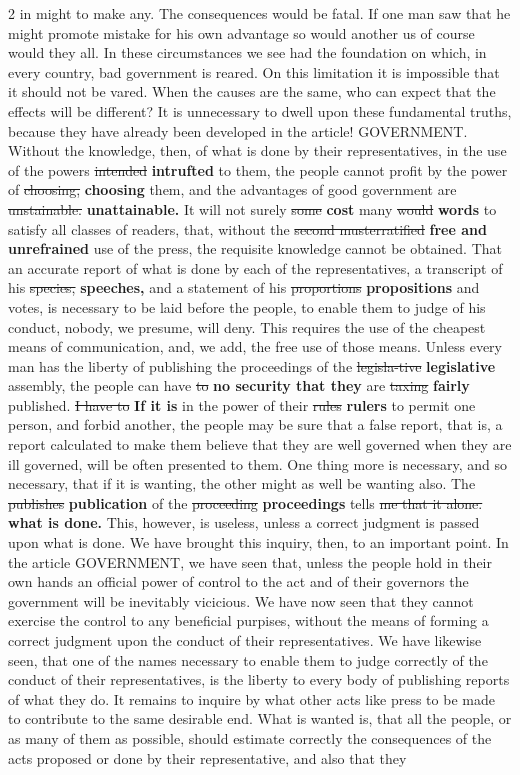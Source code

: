 \documentclass[10pt]{article}
\begin{document}
\begin{multicols}{2}
in might to make any. The consequences would be fatal. If one man saw that he might promote mistake for his own advantage so would another us of course would they all. In these circumstances we see had the foundation on which, in every country, bad government is reared. On this limitation it is impossible that it should not be vared. When the causes are the same, who can expect that the effects will be different? It is unnecessary to dwell upon these fundamental truths, because they have already been developed in the article! GOVERNMENT. Without the knowledge, then, of what is done by their representatives, in the use of the powers \sout{intended} \textbf{intrufted} to them, the people cannot profit by the power of \sout{choosing,} \textbf{choosing} them, and the advantages of good government are \sout{unstainable.} \textbf{unattainable.} It will not surely \sout{some} \textbf{cost} many \sout{would} \textbf{words} to satisfy all classes of readers, that, without the \sout{second musterratified} \textbf{free and unrefrained} use of the press, the requisite knowledge cannot be obtained. That an accurate report of what is done by each of the representatives, a transcript of his \sout{species,} \textbf{speeches,} and a statement of his \sout{proportions} \textbf{propositions} and votes, is necessary to be laid before the people, to enable them to judge of his conduct, nobody, we presume, will deny. This requires the use of the cheapest means of communication, and, we add, the free use of those means. Unless every man has the liberty of publishing the proceedings of the \sout{legisla-tive} \textbf{legislative} assembly, the people can have \sout{to} \textbf{no security that they} are \sout{taxing} \textbf{fairly} published. \sout{I have to} \textbf{If it is} in the power of their \sout{rules} \textbf{rulers} to permit one person, and forbid another, the people may be sure that a false report, that is, a report calculated to make them believe that they are well governed when they are ill governed, will be often presented to them. One thing more is necessary, and so necessary, that if it is wanting, the other might as well be wanting also. The \sout{publishes} \textbf{publication} of the \sout{proceeding} \textbf{proceedings} tells \sout{me that it alone.} \textbf{what is done.} This, however, is useless, unless a correct judgment is passed upon what is done. We have brought this inquiry, then, to an important point. In the article GOVERNMENT, we have seen that, unless the people hold in their own hands an official power of control to the act and of their governors the government will be inevitably vicicious. We have now seen that they cannot exercise the control to any beneficial purpises, without the means of forming a correct judgment upon the conduct of their representatives. We have likewise seen, that one of the names necessary to enable them to judge correctly of the conduct of their representatives, is the liberty to every body of publishing reports of what they do. It remains to inquire by what other acts like press to be made to contribute to the same desirable end. What is wanted is, that all the people, or as many of them as possible, should estimate correctly the consequences of the acts proposed or done by their representative, and also that they 
\end{multicols}
\end{document}
